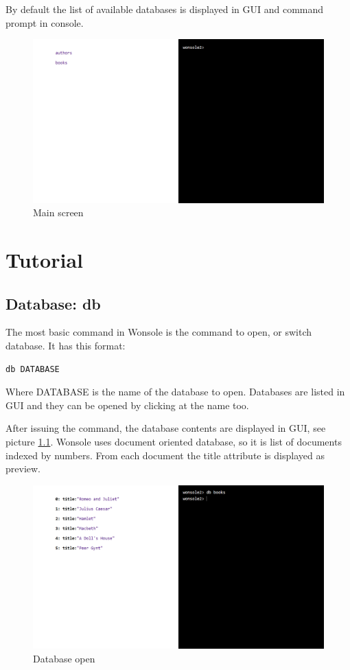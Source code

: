 By default the list of available databases is displayed in GUI and
command prompt in console.


\begin{figure}
\centering
\includegraphics[width=\textwidth]{../../manual/screenshot/wonsole2/wonsole2-00.png}
\caption{Main screen}
\label{wonsole2-00}
\end{figure}

\chapter{Tutorial}

\section{Database: db}
The most basic command in Wonsole is the command to open, or switch database. It
has this format:
\begin{verbatim}
db DATABASE
\end{verbatim}
Where DATABASE is the name of the database to open. Databases are listed in GUI
and they can be opened by clicking at the name too.

After issuing the command, the database contents are displayed in GUI, see
picture \ref{wonsole2-02}.
Wonsole uses document oriented database, so it is list of documents indexed by numbers.
From each document the title attribute is displayed as preview.


\begin{figure}
\centering
\includegraphics[width=\textwidth]{../../manual/screenshot/wonsole2/wonsole2-02.png}
\caption{Database open}
\label{wonsole2-02}
\end{figure}

